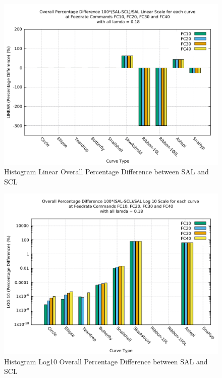 \clearpage
\pagebreak
\begin{landscape}
	
\begin{figure}
\centering
\caption  {Histogram Linear Overall Percentage Difference between SAL and SCL}
\label{img-Histogram Linear Overall Percentage Difference between SAL and SCL}
\includegraphics[width=1.30\textwidth]{Chap4/Overall/Histogram/DIFF-01-Linear-Y-Axis-Percentage-Difference-SAL-SCL.pdf} 
\end{figure}
	
\end{landscape}

\clearpage
\pagebreak
\begin{landscape}
	
\begin{figure}
\centering
\caption  {Histogram Log10 Overall Percentage Difference between SAL and SCL}
\label{img-Histogram Log10 Overall Percentage Difference between SAL and SCL}
\includegraphics[width=1.30\textwidth]{Chap4/Overall/Histogram/DIFF-02-Log-10-Y-Axis-Percentage-Difference-SAL-SCL.pdf} 
\end{figure}
	
\end{landscape}

